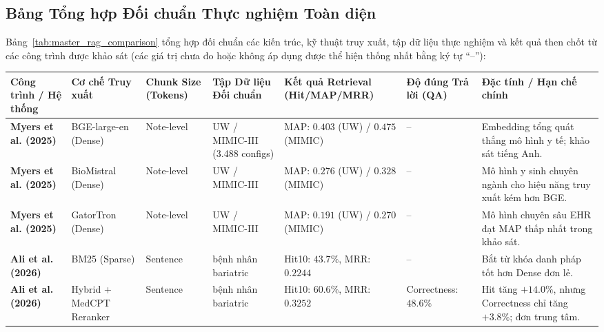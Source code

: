 \subsection{Bảng Tổng hợp Đối chuẩn Thực nghiệm Toàn diện}

Bảng~\ref{tab:master_rag_comparison} tổng hợp đối chuẩn các kiến trúc, kỹ thuật truy xuất, tập dữ liệu thực nghiệm và kết quả then chốt từ các công trình được khảo sát (các giá trị chưa đo hoặc không áp dụng được thể hiện thống nhất bằng ký tự ``--''):

\begin{table}[H]
\begin{singlespace}
\centering
\fontsize{7.0pt}{8.6pt}\selectfont
\setlength{\tabcolsep}{2.5pt}
\renewcommand{\arraystretch}{1.05}
\begin{tabularx}{\textwidth}{|>{\raggedright\arraybackslash}p{2.2cm}|>{\raggedright\arraybackslash}p{2.3cm}|>{\centering\arraybackslash}p{1.4cm}|>{\raggedright\arraybackslash}p{2.4cm}|>{\centering\arraybackslash}p{2.0cm}|>{\centering\arraybackslash}p{1.4cm}|>{\raggedright\arraybackslash}X|}
\hline
\textbf{Công trình / Hệ thống} & \textbf{Cơ chế Truy xuất} & \textbf{Chunk Size (Tokens)} & \textbf{Tập Dữ liệu Đối chuẩn} & \textbf{Kết quả Retrieval (Hit/MAP/MRR)} & \textbf{Độ đúng Trả lời (QA)} & \textbf{Đặc tính / Hạn chế chính} \\
\hline
\textbf{Myers et al. (2025)} \cite{myers2025lessons} & BGE-large-en (Dense) & Note-level & UW / MIMIC-III (3.488 configs) & MAP: $\mathbf{0.403}$ (UW) / $\mathbf{0.475}$ (MIMIC) & -- & Embedding tổng quát thắng mô hình y tế; khảo sát tiếng Anh. \\
\hline
\textbf{Myers et al. (2025)} \cite{myers2025lessons} & BioMistral (Dense) & Note-level & UW / MIMIC-III & MAP: $0.276$ (UW) / $0.328$ (MIMIC) & -- & Mô hình y sinh chuyên ngành cho hiệu năng truy xuất kém hơn BGE. \\
\hline
\textbf{Myers et al. (2025)} \cite{myers2025lessons} & GatorTron (Dense) & Note-level & UW / MIMIC-III & MAP: $0.191$ (UW) / $0.270$ (MIMIC) & -- & Mô hình chuyên sâu EHR đạt MAP thấp nhất trong khảo sát. \\
\hline
\textbf{Ali et al. (2026)} \cite{ali2026biomedical} & BM25 (Sparse) & Sentence & 200 bệnh nhân bariatric & Hit\@10: $43.7\%$, MRR: $0.2244$ & -- & Bắt từ khóa danh pháp tốt hơn Dense đơn lẻ. \\
\hline
\textbf{Ali et al. (2026)} \cite{ali2026biomedical} & Hybrid + MedCPT Reranker & Sentence & 200 bệnh nhân bariatric & Hit\@10: $\mathbf{60.6\%}$, MRR: $\mathbf{0.3252}$ & Correctness: $48.6\%$ & Hit tăng $+14.0\%$, nhưng Correctness chỉ tăng $+3.8\%$; đơn trung tâm. \\

\end{tabularx}
\end{singlespace}
\end{table}
